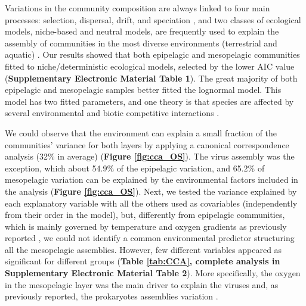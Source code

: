 \documentclass[fleqn,10pt]{wlscirep}
\begin{document}
Variations in the community composition are always linked to four main processes: selection, dispersal, drift, and speciation \cite{vellend_conceptual_2010}, and two classes of ecological models, niche-based and neutral models, are frequently used to explain the assembly of communities in the most diverse environments (terrestrial and aquatic) \cite{chave_neutral_2004, mcgill_empirical_2006}. Our results showed that both epipelagic and mesopelagic communities fitted to niche/deterministic ecological models, selected by the lower AIC value (\textbf{Supplementary Electronic Material Table 1}). The great majority of both epipelagic and mesopelagic samples better fitted the lognormal model. This model has two fitted parameters, and one theory is that species are affected by several environmental and biotic competitive interactions \cite{wilson_methods_1991}. 

We could observe that the environment can explain a small fraction of the communities’ variance for both layers by applying a canonical correspondence analysis (32\% in average) (\textbf{Figure \ref{fig:cca_OS}}). The virus assembly was the exception, which about 54.9\% of the epipelagic variation, and 65.2\% of mesopelagic variation can be explained by the environmental factors included in the analysis (\textbf{Figure \ref{fig:cca_OS}}). Next, we tested the variance explained by each explanatory variable with all the others used as covariables (independently from their order in the model), but, differently from epipelagic communities, which is mainly governed by temperature and oxygen gradients as previously reported \cite{sunagawa_structure_2015,gregory_marine_2019,ibarbalz_global_2019,giner_marked_2020, ghiglione_pole--pole_2012}, we could not identify a common environmental predictor structuring all the mesopelagic assemblies. However, few different variables appeared as significant for different groups (\textbf{Table \ref{tab:CCA}, complete analysis in Supplementary Electronic Material Table 2}). More specifically, the oxygen in the mesopelagic layer was the main driver to explain the viruses and, as previously reported, the prokaryotes assemblies variation \cite{wright_microbial_2012, ulloa_pelagic_2013, aldunate_oxygen_2018}. 
\end{document}
